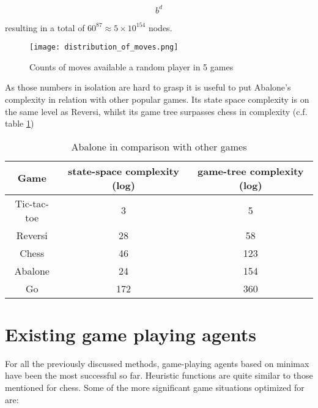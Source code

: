 \begin{equation}
    b^d
\end{equation}

resulting in a total of $60^{87} \approx 5 \times 10^{154}$ nodes. \cite{lemmens_constructing_2005}

\begin{figure}
    \centering
    \texttt{[image: distribution\_of\_moves.png]}
    \caption{Counts of moves available a random player in 5 games}
    \label{branching_factor}
\end{figure}

As those numbers in isolation are hard to grasp it is useful to put Abalone's complexity in relation with other popular games. Its state space complexity is on the same level as Reversi, whilst its game tree surpasses chess in complexity (c.f. table \ref{complexity_table})

\begin{table}
    \begin{center}
        \begin{tabular}{ | c | c | c | }
            \hline
            Game        & state-space complexity (log) & game-tree complexity (log) \\
            \hline
            Tic-tac-toe & 3                            & 5                          \\
            \hline
            Reversi     & 28                           & 58                         \\
            \hline
            Chess       & 46                           & 123                        \\
            \hline
            Abalone     & 24                           & 154                        \\
            \hline
            Go          & 172                          & 360                        \\
            \hline
        \end{tabular}
    \end{center}
    \caption{Abalone in comparison with other games \cite{chorus_implementing_2009}}
    \label{complexity_table}
\end{table}

\section{Existing game playing agents}
For all the previously discussed methods, game-playing agents based on minimax have been the most successful so far. Heuristic functions are quite similar to those mentioned for chess. Some of the more significant game situations optimized for are:

